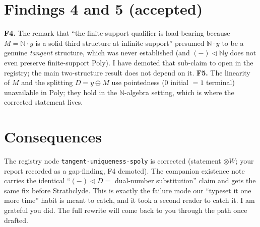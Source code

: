 \documentclass[11pt]{article}
\begin{document}
\section*{Findings 4 and 5 (accepted)}
\textbf{F4.} The remark that ``the finite-support qualifier is load-bearing because $M=\mathbb{N}\cdot y$ is a
solid third structure at infinite support'' presumed $\mathbb{N}\cdot y$ to be a genuine \emph{tangent}
structure, which was never established (and $(-)\lhd\mathbb{N}y$ does not even preserve finite-support Poly).
I have demoted that sub-claim to open in the registry; the main two-structure result does not depend on it.
\textbf{F5.} The linearity of $M$ and the splitting $D=y\oplus M$ use pointedness ($0$ initial $=1$ terminal)
unavailable in $\mathrm{Poly}$; they hold in the $\mathbb{N}$-algebra setting, which is where the corrected
statement lives.

\section*{Consequences}
The registry node \texttt{tangent-uniqueness-spoly} is corrected (statement $\otimes W$; your report recorded
as a gap-finding, F4 demoted). The companion existence note carries the identical
``$(-)\lhd D=$ dual-number substitution'' claim and gets the same fix before Strathclyde. This is exactly the
failure mode our ``typeset it one more time'' habit is meant to catch, and it took a second reader to catch it.
I am grateful you did. The full rewrite will come back to you through the path once drafted.
\end{document}
